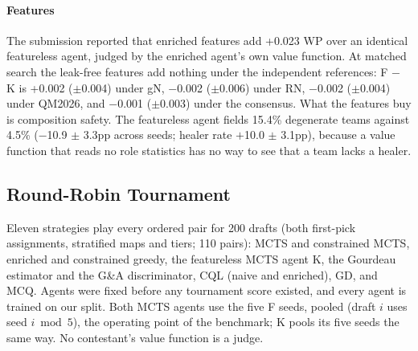 \documentclass[journal]{IEEEtran}
\begin{document}
\paragraph{Features} The submission reported that enriched features add +0.023 WP over an identical featureless agent, judged by the enriched agent's own value function. At matched search the leak-free features add nothing under the independent references: F $-$ K is +0.002 ($\pm$0.004) under gN, $-$0.002 ($\pm$0.006) under RN, $-$0.002 ($\pm$0.004) under QM2026, and $-$0.001 ($\pm$0.003) under the consensus. What the features buy is composition safety. The featureless agent fields 15.4\% degenerate teams against 4.5\% ($-$10.9 $\pm$ 3.3pp across seeds; healer rate $+$10.0 $\pm$ 3.1pp), because a value function that reads no role statistics has no way to see that a team lacks a healer.

\subsection{Round-Robin Tournament}
\label{sec:tournament}

Eleven strategies play every ordered pair for 200 drafts (both first-pick assignments, stratified maps and tiers; 110 pairs): MCTS and constrained MCTS, enriched and constrained greedy, the featureless MCTS agent K, the Gourdeau estimator and the G\&A discriminator, CQL (naive and enriched), GD, and MCQ. Agents were fixed before any tournament score existed, and every agent is trained on our split. Both MCTS agents use the five F seeds, pooled (draft $i$ uses seed $i \bmod 5$), the operating point of the benchmark; K pools its five seeds the same way. No contestant's value function is a judge.
\end{document}
